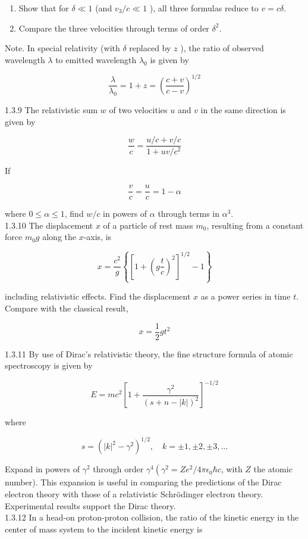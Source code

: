 \documentclass[10pt]{article}
\begin{document}
\begin{enumerate}
  \item Show that for $\delta \ll 1$ (and $v_{3} / c \ll 1$ ), all three formulas reduce to $v=c \delta$.
  \item Compare the three velocities through terms of order $\delta^{2}$.
\end{enumerate}

Note. In special relativity (with $\delta$ replaced by $z$ ), the ratio of observed wavelength $\lambda$ to emitted wavelength $\lambda_{0}$ is given by

$$
\frac{\lambda}{\lambda_{0}}=1+z=\left(\frac{c+v}{c-v}\right)^{1 / 2}
$$

1.3.9 The relativistic sum $w$ of two velocities $u$ and $v$ in the same direction is given by

$$
\frac{w}{c}=\frac{u / c+v / c}{1+u v / c^{2}}
$$

If

$$
\frac{v}{c}=\frac{u}{c}=1-\alpha
$$

where $0 \leq \alpha \leq 1$, find $w / c$ in powers of $\alpha$ through terms in $\alpha^{3}$.\\
1.3.10 The displacement $x$ of a particle of rest mass $m_{0}$, resulting from a constant force $m_{0} g$ along the $x$-axis, is

$$
x=\frac{c^{2}}{g}\left\{\left[1+\left(g \frac{t}{c}\right)^{2}\right]^{1 / 2}-1\right\}
$$

including relativistic effects. Find the displacement $x$ as a power series in time $t$. Compare with the classical result,

$$
x=\frac{1}{2} g t^{2}
$$

1.3.11 By use of Dirac's relativistic theory, the fine structure formula of atomic spectroscopy is given by

$$
E=m c^{2}\left[1+\frac{\gamma^{2}}{(s+n-|k|)^{2}}\right]^{-1 / 2}
$$

where

$$
s=\left(|k|^{2}-\gamma^{2}\right)^{1 / 2}, \quad k= \pm 1, \pm 2, \pm 3, \ldots
$$

Expand in powers of $\gamma^{2}$ through order $\gamma^{4}\left(\gamma^{2}=Z e^{2} / 4 \pi \epsilon_{0} \hbar c\right.$, with $Z$ the atomic number). This expansion is useful in comparing the predictions of the Dirac electron theory with those of a relativistic Schrödinger electron theory. Experimental results support the Dirac theory.\\
1.3.12 In a head-on proton-proton collision, the ratio of the kinetic energy in the center of mass system to the incident kinetic energy is
\end{document}
